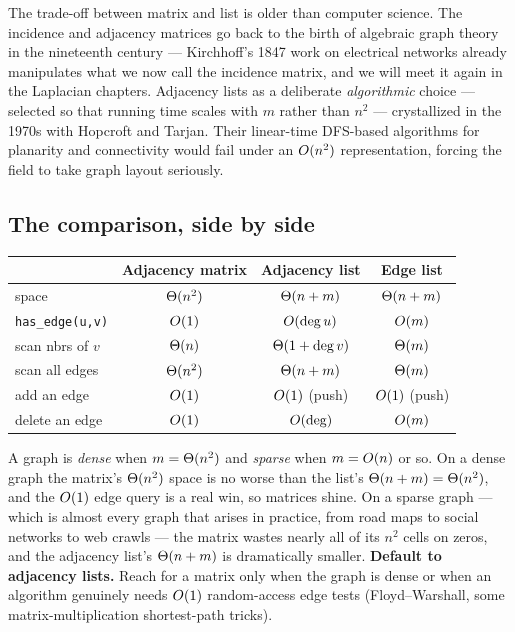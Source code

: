 \begin{historybox}
The trade-off between matrix and list is older than computer science. The
incidence and adjacency matrices go back to the birth of algebraic graph theory
in the nineteenth century --- Kirchhoff's 1847 work on electrical networks
already manipulates what we now call the incidence matrix, and we will meet it
again in the Laplacian chapters. Adjacency lists as a deliberate
\emph{algorithmic} choice --- selected so that running time scales with $m$
rather than $n^2$ --- crystallized in the 1970s with Hopcroft and Tarjan. Their
linear-time DFS-based algorithms for planarity and connectivity would fail under
an $O(n^2)$ representation, forcing the field to take graph layout seriously.
\end{historybox}

\subsection{The comparison, side by side}

\begin{center}
\renewcommand{\arraystretch}{1.3}
\begin{tabular}{lccc}
\toprule
 & \textbf{Adjacency matrix} & \textbf{Adjacency list} & \textbf{Edge list} \\
\midrule
space            & $\Theta(n^2)$ & $\Theta(n+m)$ & $\Theta(n+m)$ \\
\texttt{has\_edge(u,v)} & $O(1)$ & $O(\deg u)$ & $O(m)$ \\
scan nbrs of $v$ & $\Theta(n)$ & $\Theta(1+\deg v)$ & $\Theta(m)$ \\
scan all edges   & $\Theta(n^2)$ & $\Theta(n+m)$ & $\Theta(m)$ \\
add an edge      & $O(1)$ & $O(1)$ (push) & $O(1)$ (push) \\
delete an edge   & $O(1)$ & $O(\deg)$ & $O(m)$ \\
\bottomrule
\end{tabular}
\end{center}

\begin{intuitionbox}
A graph is \emph{dense} when $m = \Theta(n^2)$ and \emph{sparse} when
$m = O(n)$ or so. On a dense graph the matrix's $\Theta(n^2)$ space is no worse
than the list's $\Theta(n+m) = \Theta(n^2)$, and the $O(1)$ edge query is a real
win, so matrices shine. On a sparse graph --- which is almost every graph that
arises in practice, from road maps to social networks to web crawls --- the
matrix wastes nearly all of its $n^2$ cells on zeros, and the adjacency list's
$\Theta(n+m)$ is dramatically smaller. \textbf{Default to adjacency lists.} Reach
for a matrix only when the graph is dense or when an algorithm genuinely needs
$O(1)$ random-access edge tests (Floyd--Warshall, some matrix-multiplication
shortest-path tricks).
\end{intuitionbox}


